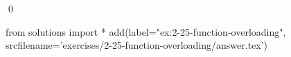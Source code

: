 
\begin{ex}
  \label{ex:2-25-function-overloading}
  
  \qed
\end{ex}
\begin{python0}
from solutions import *
add(label="ex:2-25-function-overloading",
    srcfilename='exercises/2-25-function-overloading/answer.tex')
\end{python0}
